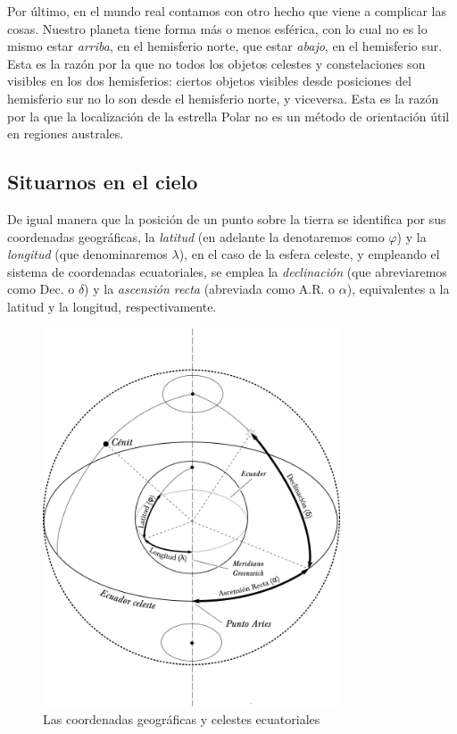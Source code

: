 \documentclass[12pt]{memoir}
\begin{document}
Por último, en el mundo real contamos con otro hecho que viene a complicar las cosas. Nuestro planeta tiene forma más o menos esférica, con lo cual no es lo mismo estar \textit{arriba}, en el hemisferio norte, que estar \textit{abajo}, en el hemisferio sur. Esta es la razón por la que no todos los objetos celestes y constelaciones son visibles en los dos hemisferios: ciertos objetos visibles desde posiciones del hemisferio sur no lo son desde el hemisferio norte, y viceversa. Esta es la razón por la que la localización de la estrella Polar no es un método de orientación útil en regiones australes.

\subsection{Situarnos en el cielo}

De igual manera que la posición de un punto sobre la tierra se identifica por sus coordenadas geográficas, la \textit{latitud} (en adelante la denotaremos como $\varphi$) y la \textit{longitud} (que denominaremos $\lambda$), en el caso de la esfera celeste, y empleando el sistema de coordenadas ecuatoriales, se emplea la \textit{declinación} (que abreviaremos como Dec. o $\delta$) y la \textit{ascensión recta} (abreviada como A.R. o $\alpha$), equivalentes a la latitud y la longitud, respectivamente.

\begin{figure}[ht]
 \centering
 \includegraphics[width=250pt,keepaspectratio=true]{./coordenadas.png}
 \caption{Las coordenadas geográficas y celestes ecuatoriales}
 \label{coordenadas}
\end{figure}
\end{document}
